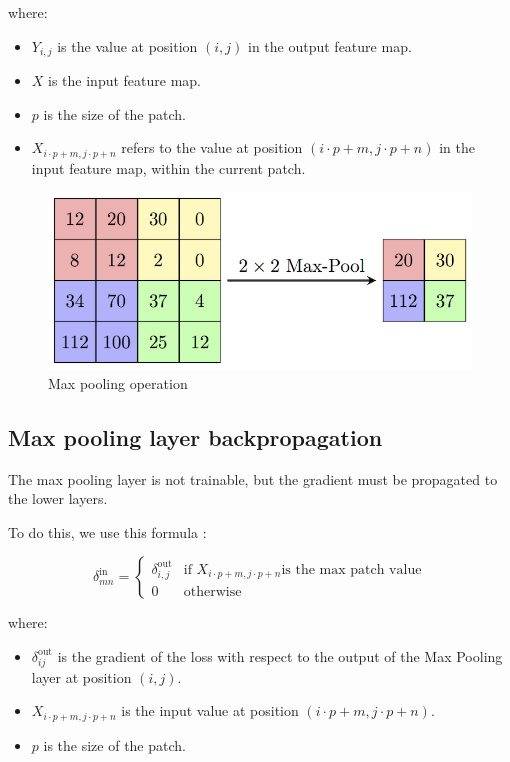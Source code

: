\documentclass[a4paper, twocolumn, twoside]{article}
\begin{document}
    where:
    \begin{itemize}
      \item \( Y_{i,j} \) is the value at position \((i, j)\) in the output feature map.
      \item \( X \) is the input feature map.
      \item \( p \) is the size of the patch.
      \item \( X_{i \cdot p + m, j \cdot p + n} \) refers to the value at position \((i \cdot p + m, j \cdot p + n)\) in the input feature map, within the current patch.
    \end{itemize}

    \begin{figure}[H]
		\begin{center}
			\includegraphics[width=\columnwidth]{images/max_pooling_layer.png}
		\end{center}
		\caption{Max pooling operation}
	\end{figure}

    \subsection{Max pooling layer backpropagation}
    The max pooling layer is not trainable, but the gradient must be propagated to the lower layers.
    
    To do this, we use this formula :

    \[
    \delta_{mn}^{\text{in}} = 
    \begin{cases}
    \delta_{i,j}^{\text{out}} & \text{if } X_{i \cdot p + m, j \cdot p + n} \text{is the max patch value} \\
    0 & \text{otherwise}
    \end{cases}
    \]
    
    where:
    \begin{itemize}
      \item \( \delta_{ij}^{\text{out}} \) is the gradient of the loss with respect to the output of the Max Pooling layer at position \((i, j)\).
      \item \( X_{i \cdot p + m, j \cdot p + n} \) is the input value at position \((i \cdot p + m, j \cdot p + n)\).
      \item \( p \) is the size of the patch.
    \end{itemize}
\end{document}
